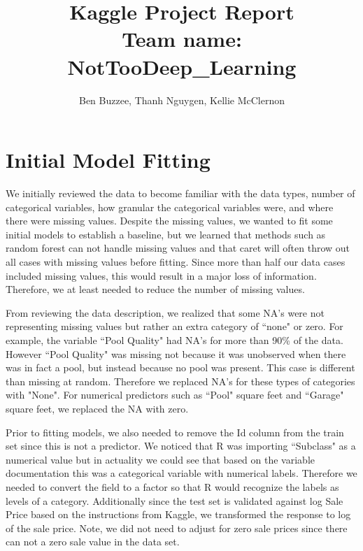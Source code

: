 \documentclass[12pt]{article}
\title{Kaggle Project Report \\ Team name: NotTooDeep\_Learning}
\author{Ben Buzzee, Thanh Nguygen, Kellie McClernon}
\begin{document}
\maketitle



\section{Initial Model Fitting}

We initially reviewed the data to become familiar with the data types, number of categorical variables, how granular the categorical variables were, and where there were missing values.  Despite the missing values, we wanted to fit some initial models to establish a baseline, but we learned that methods such as random forest can not handle missing values and that caret will often throw out all cases with missing values before fitting.  Since more than half our data cases included missing values, this would result in a major loss of information.  Therefore, we at least needed to reduce the number of missing values.

From reviewing the data description, we realized that some NA's were not representing missing values but rather an extra category of ``none" or zero.  For example, the variable ``Pool Quality" had NA's for more than 90\% of the data.  However ``Pool Quality" was missing not because it was unobserved when there was in fact a pool, but instead because no pool was present.  This case is different than missing at random.  Therefore we replaced NA's for these types of categories with "None".  For numerical predictors such as ``Pool" square feet and ``Garage" square feet, we replaced the NA with zero.

Prior to fitting models, we also needed to remove the Id column from the train set since this is not a predictor.  We noticed that R was importing ``Subclass" as a numerical value but in actuality we could see that based on the variable documentation this was a categorical variable with numerical labels.  Therefore we needed to convert the field to a factor so that R would recognize the labels as levels of a category.  Additionally since the test set is validated against log Sale Price based on the instructions from Kaggle, we transformed the response to log of the sale price.  Note,  we did not need to adjust for zero sale prices since there can not a zero sale value in the data set.
\end{document}
